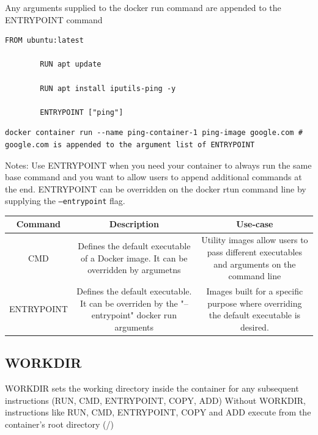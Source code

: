 \documentclass[11pt]{book}
\begin{document}
    Any arguments supplied to the docker run command are appended to the ENTRYPOINT command

    \begin{lstlisting}[style=dockerstyle,caption={Example Dockerfile}]
        FROM ubuntu:latest

        RUN apt update

        RUN apt install iputils-ping -y

        ENTRYPOINT ["ping"]
    \end{lstlisting}

    \begin{lstlisting}[style=terminal]
        docker container run --name ping-container-1 ping-image google.com # google.com is appended to the argument list of ENTRYPOINT
    \end{lstlisting}

    Notes:
    Use ENTRYPOINT when you need your container to always run the same base command and you want to allow users to append additional commands at the end.
    ENTRYPOINT can be overridden on the docker rtun command line by supplying the \texttt{--entrypoint} flag.

    \begin{table}[ht]
        \centering
        \begin{tabular}{|c|c|c|}
            \hline
            Command         & Description & Use-case \\ \hline
            CMD             & Defines the default executable of a Docker image. It can be overridden by argumetns & Utility images allow users to pass different executables and arguments on the command line    \\ \hline
            ENTRYPOINT      & Defines the default executable. It can be overriden by the "--entrypoint" docker run arguments & Images built for a specific purpose where overriding the default executable is desired.    \\ \hline
        \end{tabular}
    \end{table}

    \subsection{WORKDIR}
    WORKDIR sets the working directory inside the container for any subsequent instructions (RUN, CMD, ENTRYPOINT, COPY, ADD)
    Without WORKDIR, instructions like RUN, CMD, ENTRYPOINT, COPY and ADD execute from the container's root directory (/)
\end{document}
